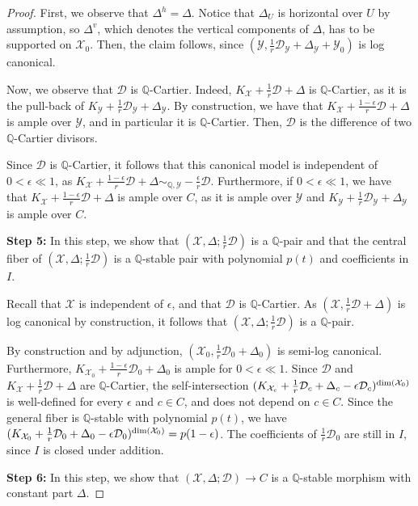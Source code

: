 \documentclass{amsart}
\newcommand{\bQ}{\mathbb{Q}}
\newcommand{\cD}{\mathcal{D}}
\newcommand{\cX}{\mathcal{X}}
\newcommand{\cY}{\mathcal{Y}}
\theoremstyle{definition}
\newcommand{\rar}{\rightarrow}
\def\K#1.{K_{#1}}
\renewcommand{\qq}{\mathbb{Q}}
\begin{document}
\begin{proof}
First, we observe that $\Delta^h=\Delta$.
Notice that $\Delta_U$ is horizontal over $U$ by assumption, so $\Delta^v$, which denotes the vertical components of $\Delta$, has to be supported on $\cX_0$.
Then, the claim follows, since $(\cY,\frac{1}{r}\cD_\cY+\Delta_\cY + \cY_0)$ is log canonical.


Now, we observe that $\cD$ is $\qq$-Cartier.
Indeed, $\K \cX. + \frac{1}{r}\cD+\Delta$ is $\qq$-Cartier, as it is the pull-back of $\K \cY. + \frac{1}{r}\cD_\cY + \Delta_\cY$.
By construction, we have that $\K \cX. + \frac{1-\epsilon}{r}\cD + \Delta$ is ample over $\cY$, and in particular it is $\qq$-Cartier.
Then, $\cD$ is the difference of two $\qq$-Cartier divisors.


Since $\cD$ is $\qq$-Cartier, it follows that this canonical model is independent of $0 < \epsilon \ll 1$, as $\K \cX. + \frac{1-\epsilon}{r}\cD + \Delta \sim_{\qq,\cY} -\frac{\epsilon}{r}\cD$.
Furthermore, if $0 < \epsilon \ll 1$, we have that $\K \cX. + \frac{1-\epsilon}{r}\cD + \Delta$ is ample over $C$, as it is ample over $\cY$ and $\K \cY. + \frac{1}{r}\cD_\cY + \Delta_\cY$ is ample over $C$. 


{\bf Step 5:} In this step, we show that $(\cX,\Delta;\frac{1}{r}\cD)$ is a $\bQ$-pair and that the central fiber of $(\cX,\Delta;\frac{1}{r}\cD)$ is a $\bQ$-stable pair with polynomial $p(t)$ and coefficients in $I$.


Recall that $\cX$ is independent of $\epsilon$, and that $\cD$ is $\qq$-Cartier.
As $(\cX,\frac{1}{r}\cD + \Delta)$ is log canonical by construction, it follows that $(\cX,\Delta;\frac{1}{r}\cD)$ is a $\bQ$-pair.


By construction and by adjunction, $(\cX_0,\frac{1}{r}\cD_0 + \Delta_0)$ is semi-log canonical.
Furthermore, $\K \cX_0. + \frac{1-\epsilon}{r}\cD_0 + \Delta_0$ is ample for $0 < \epsilon \ll 1$.
Since $\cD$ and $K_{\cX} + \frac{1}{r}\cD +\Delta$ are $\mathbb{Q}$-Cartier, the self-intersection $(K_{\cX_c} + \frac{1}{r}\cD_c +\Delta_c-\epsilon \cD_c)^{{\rm dim}(\cX_0)}$ is well-defined for every $\epsilon$ and $c\in C$, and does not depend on $c \in C$.
Since the general fiber is $\bQ$-stable with polynomial $p(t)$, we have $(K_{\cX_0} + \frac{1}{r}\cD_0 +\Delta_0-\epsilon \cD_0)^{{\rm dim}(\cX_0)} = p(1-\epsilon)$.
The coefficients of $\frac{1}{r}\cD_0$ are still in $I$,  since $I$ is closed under addition.

{\bf Step 6:} In this step, we show that $(\cX, \Delta;\cD) \rar C$ is a $\bQ$-stable morphism with constant part $\Delta$.


\end{proof}
\end{document}
